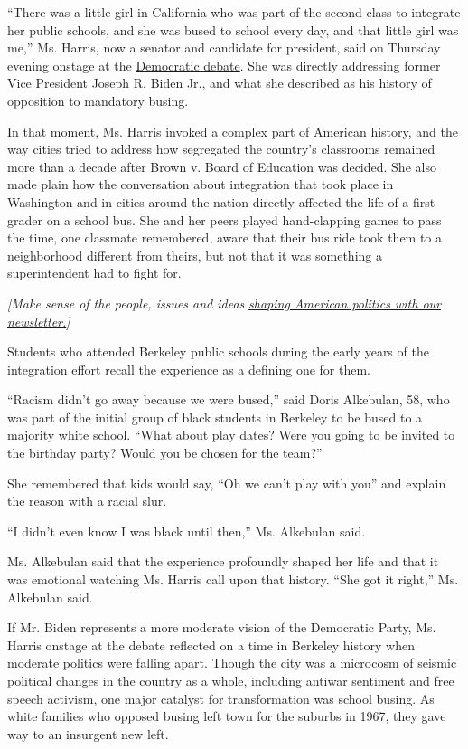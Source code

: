 ``There was a little girl in California who was part of the second class
to integrate her public schools, and she was bused to school every day,
and that little girl was me,'' Ms. Harris, now a senator and candidate
for president, said on Thursday evening onstage at the
\href{https://www.nytimes3xbfgragh.onion/news-event/democratic-debates}{Democratic
debate}. She was directly addressing former Vice President Joseph R.
Biden Jr., and what she described as his history of opposition to
mandatory busing.

In that moment, Ms. Harris invoked a complex part of American history,
and the way cities tried to address how segregated the country's
classrooms remained more than a decade after Brown v. Board of Education
was decided. She also made plain how the conversation about integration
that took place in Washington and in cities around the nation directly
affected the life of a first grader on a school bus. She and her peers
played hand-clapping games to pass the time, one classmate remembered,
aware that their bus ride took them to a neighborhood different from
theirs, but not that it was something a superintendent had to fight for.

\emph{{[}Make sense of the people, issues and ideas}
\emph{\href{https://www.nytimes3xbfgragh.onion/newsletters/politics?smid=rd?action=click\&module=Intentional\&pgtype=Article}{shaping
American politics with our newsletter.}{]}}

Students who attended Berkeley public schools during the early years of
the integration effort recall the experience as a defining one for them.

``Racism didn't go away because we were bused,'' said Doris Alkebulan,
58, who was part of the initial group of black students in Berkeley to
be bused to a majority white school. ``What about play dates? Were you
going to be invited to the birthday party? Would you be chosen for the
team?''

She remembered that kids would say, ``Oh we can't play with you'' and
explain the reason with a racial slur.

``I didn't even know I was black until then,'' Ms. Alkebulan said.

Ms. Alkebulan said that the experience profoundly shaped her life and
that it was emotional watching Ms. Harris call upon that history. ``She
got it right,'' Ms. Alkebulan said.

If Mr. Biden represents a more moderate vision of the Democratic Party,
Ms. Harris onstage at the debate reflected on a time in Berkeley history
when moderate politics were falling apart. Though the city was a
microcosm of seismic political changes in the country as a whole,
including antiwar sentiment and free speech activism, one major catalyst
for transformation was school busing. As white families who opposed
busing left town for the suburbs in 1967, they gave way to an insurgent
new left.

